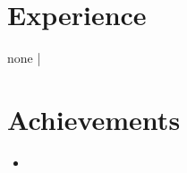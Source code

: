 \documentclass[10pt, letterpaper]{article}
\newenvironment{onecolentry}{}{} %
\begin{document}
\section{Experience}
\begin{onecolentry}
    \textbf{} \hfill none | 
\end{onecolentry}

\section{Achievements}
\begin{onecolentry}
    \begin{itemize}
        \item 
    \end{itemize}
\end{onecolentry}
\end{document}
